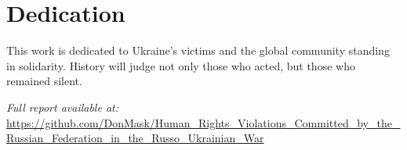 \documentclass[a4paper,12pt]{article}
\begin{document}
\section*{Dedication}
This work is dedicated to Ukraine’s victims and the global community standing in solidarity. History will judge not only those who acted, but those who remained silent.

\vspace{0.5em}
\noindent \textit{Full report available at:} \\
\url{https://github.com/DonMask/Human_Rights_Violations_Committed_by_the_Russian_Federation_in_the_Russo_Ukrainian_War}
\end{document}
